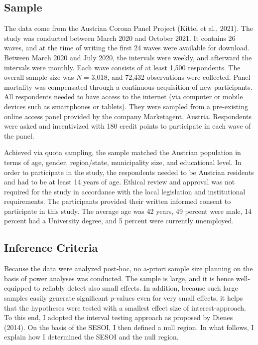 \documentclass[
  man,mask]{apa6}
\begin{document}
\hypertarget{sample}{%
\subsection{Sample}\label{sample}}

The data come from the Austrian Corona Panel Project (Kittel et al., 2021).
The study was conducted between March 2020 and October 2021.
It contains 26 waves, and at the time of writing the first 24 waves were available for download.
Between March 2020 and July 2020, the intervals were weekly, and afterward the intervals were monthly.
Each wave consists of at least 1,500 respondents.
The overall sample size was \emph{N} = 3,018, and 72,432 observations were collected.
Panel mortality was compensated through a continuous acquisition of new participants.
All respondents needed to have access to the internet (via computer or mobile devices such as smartphones or tablets).
They were sampled from a pre-existing online access panel provided by the company Marketagent, Austria.
Respondents were asked and incentivized with 180 credit points to participate in each wave of the panel.

Achieved via quota sampling, the sample matched the Austrian population in terms of age, gender, region/state, municipality size, and educational level.
In order to participate in the study, the respondents needed to be Austrian residents and had to be at least 14 years of age.
Ethical review and approval was not required for the study in accordance with the local legislation and institutional requirements.
The participants provided their written informed consent to participate in this study.
The average age was 42 years, 49 percent were male, 14 percent had a University degree, and 5 percent were currently unemployed.

\hypertarget{inference-criteria}{%
\subsection{Inference Criteria}\label{inference-criteria}}

Because the data were analyzed post-hoc, no a-priori sample size planning on the basis of power analyses was conducted.
The sample is large, and it is hence well-equipped to reliably detect also small effects.
In addition, because such large samples easily generate significant \emph{p}-values even for very small effects, it helps that the hypotheses were tested with a smallest effect size of interest-approach.
To this end, I adopted the interval testing approach as proposed by Dienes (2014).
On the basis of the SESOI, I then defined a null region.
In what follows, I explain how I determined the SESOI and the null region.
\end{document}
